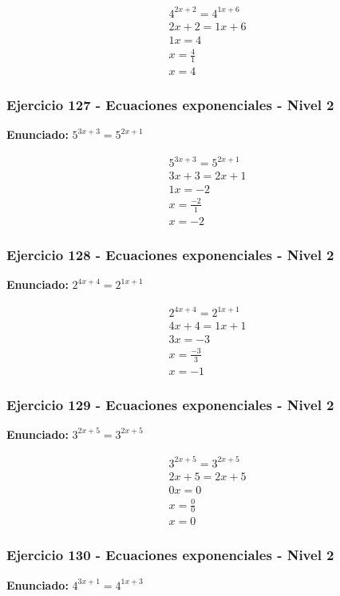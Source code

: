 \documentclass[12pt,a4paper]{article}
\begin{document}
\[
\begin{aligned}
4^{2x+2}=4^{1x+6}\\
2x+2=1x+6\\
1x=4\\
x=\frac{4}{1}\\
\boxed{x=4}
\end{aligned}
\]


\subsubsection*{Ejercicio 127 - Ecuaciones exponenciales - Nivel 2}
\textbf{Enunciado:} \(5^{3x+3}=5^{2x+1}\)

\[
\begin{aligned}
5^{3x+3}=5^{2x+1}\\
3x+3=2x+1\\
1x=-2\\
x=\frac{-2}{1}\\
\boxed{x=-2}
\end{aligned}
\]


\subsubsection*{Ejercicio 128 - Ecuaciones exponenciales - Nivel 2}
\textbf{Enunciado:} \(2^{4x+4}=2^{1x+1}\)

\[
\begin{aligned}
2^{4x+4}=2^{1x+1}\\
4x+4=1x+1\\
3x=-3\\
x=\frac{-3}{3}\\
\boxed{x=-1}
\end{aligned}
\]


\subsubsection*{Ejercicio 129 - Ecuaciones exponenciales - Nivel 2}
\textbf{Enunciado:} \(3^{2x+5}=3^{2x+5}\)

\[
\begin{aligned}
3^{2x+5}=3^{2x+5}\\
2x+5=2x+5\\
0x=0\\
x=\frac{0}{0}\\
\boxed{x=0}
\end{aligned}
\]


\subsubsection*{Ejercicio 130 - Ecuaciones exponenciales - Nivel 2}
\textbf{Enunciado:} \(4^{3x+1}=4^{1x+3}\)
\end{document}
